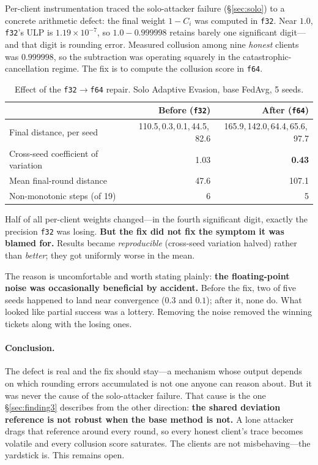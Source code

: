 \documentclass[11pt,a4paper]{article}
\newcommand{\code}[1]{\texttt{\small #1}}
\newcommand{\best}[1]{\textbf{#1}}
\begin{document}
Per-client instrumentation traced the solo-attacker failure
(\S\ref{sec:solo}) to a concrete arithmetic defect: the final weight
$1 - C_i$ was computed in \code{f32}. Near $1.0$, \code{f32}'s ULP is
$1.19 \times 10^{-7}$, so $1.0 - 0.999998$ retains barely one significant
digit---and that digit is rounding error. Measured collusion among nine
\emph{honest} clients was $0.999998$, so the subtraction was operating
squarely in the catastrophic-cancellation regime. The fix is to compute
the collusion score in \code{f64}.

\begin{table}[htbp]
\centering
\small
\caption{Effect of the \code{f32}$\rightarrow$\code{f64} repair. Solo
Adaptive Evasion, base FedAvg, 5 seeds.}
\label{tab:f64}
\begin{tabular}{lrr}
\toprule
 & \textbf{Before (\code{f32})} & \textbf{After (\code{f64})} \\
\midrule
Final distance, per seed & 110.5,\,0.3,\,0.1,\,44.5,\,82.6 & 165.9,\,142.0,\,64.4,\,65.6,\,97.7 \\
Cross-seed coefficient of variation & 1.03 & \best{0.43} \\
Mean final-round distance & 47.6 & 107.1 \\
Non-monotonic steps (of 19) & 6 & 5 \\
\bottomrule
\end{tabular}
\end{table}

Half of all per-client weights changed---in the fourth significant digit,
exactly the precision \code{f32} was losing. \textbf{But the fix did not
fix the symptom it was blamed for.} Results became \emph{reproducible}
(cross-seed variation halved) rather than \emph{better}; they got
uniformly worse in the mean.

The reason is uncomfortable and worth stating plainly: \textbf{the
floating-point noise was occasionally beneficial by accident.} Before the
fix, two of five seeds happened to land near convergence ($0.3$ and
$0.1$); after it, none do. What looked like partial success was a lottery.
Removing the noise removed the winning tickets along with the losing ones.

\paragraph{Conclusion.} The defect is real and the fix should stay---a
mechanism whose output depends on which rounding errors accumulated is not
one anyone can reason about. But it was never the cause of the
solo-attacker failure. That cause is the one \S\ref{sec:finding3}
describes from the other direction: \textbf{the shared deviation reference
is not robust when the base method is not.} A lone attacker drags that
reference around every round, so every honest client's trace becomes
volatile and every collusion score saturates. The clients are not
misbehaving---the yardstick is. This remains open.
\end{document}
